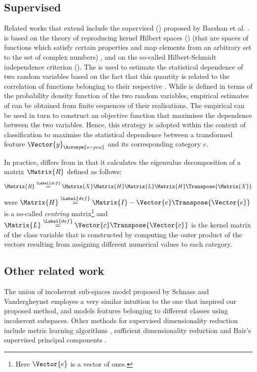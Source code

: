 \documentclass{article}
\def \newFea{\Vector{y}} 	%
\def \cat{c} 			%
\def \definition{\overset{\Label{def}}{=}}	%
\begin{document}
\subsection{Supervised }
Related works that extend  include the supervised  () proposed by Barshan et al. \cite{Barshan2011Su}.  is based on the theory of reproducing kernel Hilbert spaces () (that are spaces of functions which satisfy certain properties and map elements from an arbitrary set to the set of complex numbers) \cite{Aronszajn:1950}, and on the so-called Hilbert-Schmidt independence criterion ()\cite{gretton2005measuring}. The  is used to estimate the statistical dependence of two random variables based on the fact that this quantity is related to the correlation of functions belonging to their respective . While  is defined in terms of the probability density function of the two random variables,  empirical estimates of  can be obtained from finite sequences of their realisations. The empirical  can be used in turn to construct an objective function that maximises the dependence between the two variables. Hence, this strategy is adopted within the context of classification to maximise the statistical dependence between a transformed feature $\newFea_{\Acronym{s-pca}}$ and its corresponding category $\cat$.

In practice,  differs from  in that it calculates the eigenvalue decomposition of a matrix $\Matrix{R}$ defined as follows:
\begin{equation}
\Matrix{R} \definition \Matrix{X}\Matrix{H}\Matrix{L}\Matrix{H}\Transpose{\Matrix{X}}
\end{equation}
were $\Matrix{H} \definition \Matrix{I} - \Vector{e}\Transpose{\Vector{e}}$ is a so-called \emph{centring} matrix\footnote{Here $\Vector{e}$ is a vector of ones.} and $\Matrix{L} \definition \Vector{\cat}\Transpose{\Vector{\cat}}$ is the kernel matrix of the class variable that is constructed by computing the outer product of the vectors resulting from assigning different numerical values to each category. 

\subsection{Other related work}
The union of incoherent sub-spaces model proposed by Schnass and Vandergheynst \cite{Schnass2010A-} employes a very similar intuition to the one that inspired our proposed method, and models features belonging to different classes using incoherent subspaces. Other methods for supervised dimensionality reduction include metric learning algorithms \cite{xing2002distance}, sufficient dimensionality reduction \cite{li1991sliced} and Bair's supervised principal components \cite{Bair06predictionby}.
\end{document}
